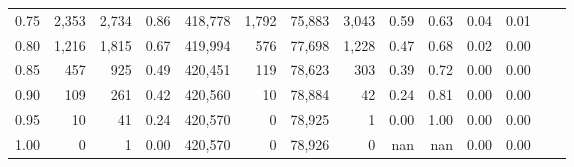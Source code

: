 \begin{tabular}{rrrrrrrrrrrrrr}
0.75 &   2,353 &  2,734 &    0.86 &  418,778 &    1,792 &  75,883 &   3,043 &  0.59 &  0.63 &  0.04 &      0.01 \\
0.80 &   1,216 &  1,815 &    0.67 &  419,994 &      576 &  77,698 &   1,228 &  0.47 &  0.68 &  0.02 &      0.00 \\
0.85 &     457 &    925 &    0.49 &  420,451 &      119 &  78,623 &     303 &  0.39 &  0.72 &  0.00 &      0.00 \\
0.90 &     109 &    261 &    0.42 &  420,560 &       10 &  78,884 &      42 &  0.24 &  0.81 &  0.00 &      0.00 \\
0.95 &      10 &     41 &    0.24 &  420,570 &        0 &  78,925 &       1 &  0.00 &  1.00 &  0.00 &      0.00 \\
1.00 &       0 &      1 &    0.00 &  420,570 &        0 &  78,926 &       0 &   nan &   nan &  0.00 &      0.00 \\
\bottomrule
\end{tabular}
